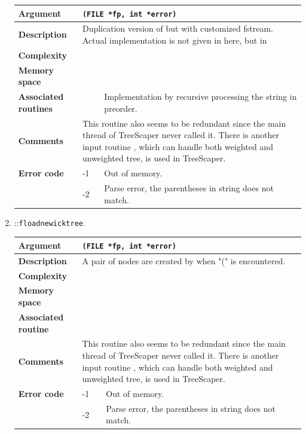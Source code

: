 \documentclass[11pt,a4paper]{article}
\newcommand{\myuline}[1]{%
	\uline{\phantom{#1}}%
	\llap{\contour{white}{#1}}%
}
\newcommand{\mrref}[1]{\texttt{#1}\label{#1}}
\newcommand{\rref}[1]{\hyperref[#1]{\textcolor{blue}{\myuline{\texttt{#1}}}}}
\theoremstyle{definition}
\theoremstyle{definition}
\numberwithin{equation}{section}
\begin{document}
\begin{enumerate}
		\begin{tabular}{>{\bfseries}lp{}p{}}
			\hline
			Argument & \multicolumn{2}{p{0.6\textwidth}}{\texttt{(FILE *fp, int *error)}} \\
			\hline
			Description & \multicolumn{2}{p{0.6\textwidth}}{Duplication version of \rref{loadnewicktree} but with customized fstream. Actual implementation is not given in here, but in \rref{floadnewicktree}} \\
			\hline
			Complexity&   &  \\
			Memory space&   &  \\
			\hline
			Associated routines & \rref{floadnewicktree} & Implementation by recursive processing the string in preorder.\\
			\hline
			Comments & \multicolumn{2}{p{0.6\textwidth}}{This routine also seems to be redundant since the main thread of TreeScaper never called it. There is another input routine \rref{parsetree}, which can handle both weighted and unweighted tree, is used in TreeScaper.} \\
			\hline
			Error code & -1 & Out of memory.\\
			& -2 & Parse error, the parentheses in string does not match.\\
			\hline
		\end{tabular}
		
		
		\item \rref{TreeOPE}::\mrref{floadnewicktree}.
		
		\begin{tabular}{>{\bfseries}lp{}p{}}
			\hline
			Argument & \multicolumn{2}{p{0.6\textwidth}}{\texttt{(FILE *fp, int *error)}} \\
			\hline
			Description & \multicolumn{2}{p{0.6\textwidth}}{A pair of nodes are created by \rref{loadnode} when "(" is encountered.} \\
			\hline
			Complexity&   &  \\
			Memory space&   &  \\
			\hline
			Associated routine& \rref{loadnode} & \\
			\hline
			Comments & \multicolumn{2}{p{0.6\textwidth}}{This routine also seems to be redundant since the main thread of TreeScaper never called it. There is another input routine \rref{parsetree}, which can handle both weighted and unweighted tree, is used in TreeScaper.} \\
			\hline
			Error code & -1 & Out of memory.\\
			& -2 & Parse error, the parentheses in string does not match.\\
			\hline
		\end{tabular}
	

\end{enumerate}
\end{document}

